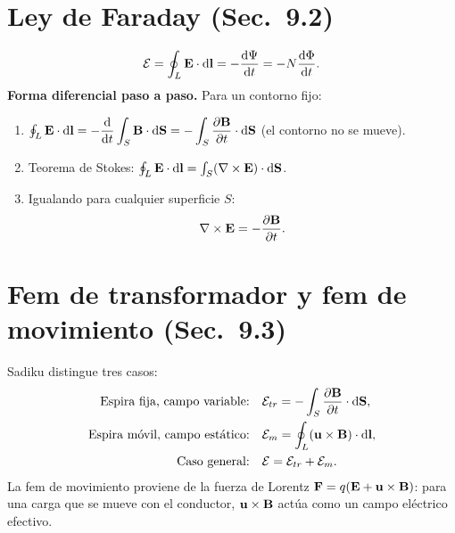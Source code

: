 \documentclass[11pt]{article}
\begin{document}
\section{Ley de Faraday (Sec.~9.2)}
\begin{equation}
  \mathcal{E}=\oint_L\mathbf{E}\cdot\mathrm{d}\mathbf{l}=-\frac{\mathrm{d}\Psi}{\mathrm{d} t}=-N\frac{\mathrm{d}\Phi}{\mathrm{d} t}.
  \label{eq:faraday}
\end{equation}
\textbf{Forma diferencial paso a paso.} Para un contorno fijo:
\begin{enumerate}
  \item $\oint_L\mathbf{E}\cdot\mathrm{d}\mathbf{l}=-\dfrac{\mathrm{d}}{\mathrm{d} t}\displaystyle\int_S\mathbf{B}\cdot\mathrm{d}\mathbf{S}
        =-\int_S\frac{\partial\mathbf{B}}{\partial t}\cdot\mathrm{d}\mathbf{S}$ (el contorno no se mueve).
  \item Teorema de Stokes: $\oint_L\mathbf{E}\cdot\mathrm{d}\mathbf{l}=\int_S(\nabla\times\mathbf{E})\cdot\mathrm{d}\mathbf{S}$.
  \item Igualando para cualquier superficie $S$:
        \begin{equation}\nabla\times\mathbf{E}=-\frac{\partial\mathbf{B}}{\partial t}.\end{equation}
\end{enumerate}

\section{Fem de transformador y fem de movimiento (Sec.~9.3)}
Sadiku distingue tres casos:
\begin{align}
  \text{Espira fija, campo variable:}\quad &\mathcal{E}_{tr}=-\int_S\frac{\partial\mathbf{B}}{\partial t}\cdot\mathrm{d}\mathbf{S},\\
  \text{Espira móvil, campo estático:}\quad &\mathcal{E}_{m}=\oint_L(\mathbf{u}\times\mathbf{B})\cdot\mathrm{d}\mathbf{l},\\
  \text{Caso general:}\quad &\mathcal{E}=\mathcal{E}_{tr}+\mathcal{E}_{m}.
\end{align}
La fem de movimiento proviene de la fuerza de Lorentz $\mathbf{F}=q(\mathbf{E}+\mathbf{u}\times\mathbf{B})$: para una
carga que se mueve con el conductor, $\mathbf{u}\times\mathbf{B}$ actúa como un campo eléctrico efectivo.
\end{document}
